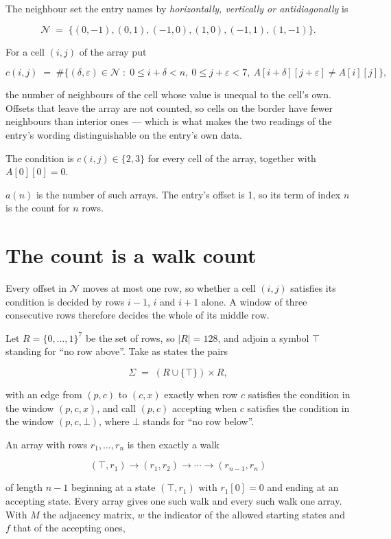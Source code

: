 \documentclass[11pt]{article}
\theoremstyle{definition}
\begin{document}
The neighbour set the entry names by {\itshape horizontally, vertically or antidiagonally} is

\[\mathcal{N} \;=\; \{(0,-1), (0,1), (-1,0), (1,0), (-1,1), (1,-1)\}.\]

For a cell $(i,j)$ of the array put

\[c(i,j) \;=\; \#\bigl\{(\delta,\varepsilon)\in\mathcal{N} \;:\; 0\le i+\delta<n,\ 0\le j+\varepsilon<7,\ A[i+\delta][j+\varepsilon] \neq A[i][j]\bigr\},\]

the number of neighbours of the cell whose value is unequal to the cell's own. Offsets that leave the array are not counted, so cells on the border have fewer neighbours than interior ones --- which is what makes the two readings of the entry's wording distinguishable on the entry's own data.

The condition is $c(i,j) \in \{2, 3\}$ for every cell of the array, together with $A[0][0]=0$.

$a(n)$ is the number of such arrays. The entry's offset is 1, so its term of index $n$ is the count for $n$ rows.

\section{The count is a walk count}

Every offset in $\mathcal{N}$ moves at most one row, so whether a cell $(i,j)$ satisfies its condition is decided by rows $i-1$, $i$ and $i+1$ alone. A window of three consecutive rows therefore decides the whole of its middle row.

Let $R = \{0,\dots,1\}^{7}$ be the set of rows, so $|R| = 128$, and adjoin a symbol $\top$ standing for ``no row above''. Take as states the pairs

\[\Sigma \;=\; (R \cup \{\top\}) \times R,\]

with an edge from $(p,c)$ to $(c,x)$ exactly when row $c$ satisfies the condition in the window $(p,c,x)$, and call $(p,c)$ accepting when $c$ satisfies the condition in the window $(p,c,\bot)$, where $\bot$ stands for ``no row below''.

An array with rows $r_1,\dots,r_n$ is then exactly a walk

\[(\top,r_1) \to (r_1,r_2) \to \cdots \to (r_{n-1},r_n)\]

of length $n-1$ beginning at a state $(\top,r_1)$ with $r_1[0]=0$ and ending at an accepting state. Every array gives one such walk and every such walk one array. With $M$ the adjacency matrix, $w$ the indicator of the allowed starting states and $f$ that of the accepting ones,
\end{document}
